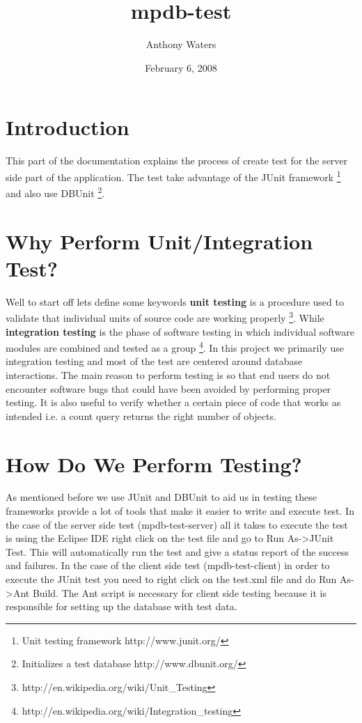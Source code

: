 \documentclass[10pt,letterpaper,onecolumn,oneside]{report}
\begin{document}
\title{mpdb-test}
\author{Anthony Waters}
\date{February 6, 2008}
\maketitle
\tableofcontents
\newpage
\section{Introduction}
This part of the documentation explains the process of create test
for the server side part of the application.  The test take advantage
of the JUnit framework
\footnote{Unit testing framework http://www.junit.org/}
and also use DBUnit
\footnote{Initializes a test database http://www.dbunit.org/}.
\section{Why Perform Unit/Integration Test?}
Well to start off lets define some keywords \textbf{unit testing}
is a procedure used to validate that individual units of source code are working properly
\footnote{http://en.wikipedia.org/wiki/Unit\_Testing}. While
\textbf{integration testing} is the phase of software testing in which individual software modules are combined and tested as a group
\footnote{http://en.wikipedia.org/wiki/Integration\_testing}.
In this project we primarily use integration testing and most
of the test are centered around database interactions.  The main
reason to perform testing is so that end users do not encounter software
bugs that could have been avoided by performing proper testing.
It is also useful to verify whether a certain piece of code that works
as intended i.e. a count query returns the right number of objects.
\section{How Do We Perform Testing?}
As mentioned before we use JUnit and DBUnit to aid us in testing
these frameworks provide a lot of tools that make it easier to write
and execute test.  In the case of the server side test (mpdb-test-server) all it
takes to execute the test is using the Eclipse IDE right click on the test file 
and go to Run As->JUnit Test.  This will automatically run the test and give a status report of the success and failures.  In the case of the client side test
(mpdb-test-client) in order to execute the JUnit test you need to right click on the 
test.xml file and do Run As->Ant Build.  The Ant script is necessary for client side
testing because it is responsible for setting up the database with test data.
\end{document}
